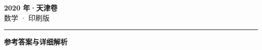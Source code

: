 \documentclass[zihao=5, a4paper]{ctexart}
\begin{document}
\begin{center}
  {\Large\bfseries 2020 年·天津卷}\\[4pt]
  {\large 数学 · 印刷版}
\end{center}
\medskip
{}

\par\bigskip\hrule\bigskip
{}
\Needspace{0.55\textheight}
\begin{center}{\large\bfseries 参考答案与详细解析}\end{center}
\smallskip

\end{document}
